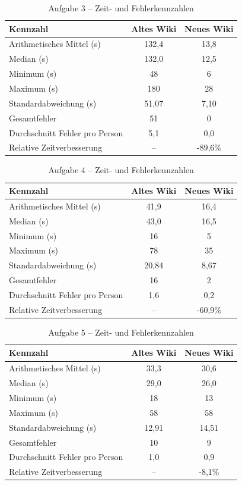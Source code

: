 \begin{table}[H]
\centering
\caption{Aufgabe 3 -- Zeit- und Fehlerkennzahlen}
\label{tab:BB-task3-stats}
\begin{tabular}{l c c}
\toprule
Kennzahl & Altes Wiki & Neues Wiki \\
\midrule
Arithmetisches Mittel (s) & 132,4 & 13,8 \\
Median (s) & 132,0 & 12,5 \\
Minimum (s) & 48 & 6 \\
Maximum (s) & 180 & 28 \\
Standardabweichung (s) & 51,07 & 7,10 \\
Gesamtfehler & 51 & 0 \\
Durchschnitt Fehler pro Person & 5,1 & 0,0 \\
Relative Zeitverbesserung & -- & -89,6\% \\
\bottomrule
\end{tabular}
\end{table}

\begin{table}[H]
\centering
\caption{Aufgabe 4 -- Zeit- und Fehlerkennzahlen}
\label{tab:BB-task4-stats}
\begin{tabular}{l c c}
\toprule
Kennzahl & Altes Wiki & Neues Wiki \\
\midrule
Arithmetisches Mittel (s) & 41,9 & 16,4 \\
Median (s) & 43,0 & 16,5 \\
Minimum (s) & 16 & 5 \\
Maximum (s) & 78 & 35 \\
Standardabweichung (s) & 20,84 & 8,67 \\
Gesamtfehler & 16 & 2 \\
Durchschnitt Fehler pro Person & 1,6 & 0,2 \\
Relative Zeitverbesserung & -- & -60,9\% \\
\bottomrule
\end{tabular}
\end{table}

\begin{table}[H]
\centering
\caption{Aufgabe 5 -- Zeit- und Fehlerkennzahlen}
\label{tab:BB-task5-stats}
\begin{tabular}{l c c}
\toprule
Kennzahl & Altes Wiki & Neues Wiki \\
\midrule
Arithmetisches Mittel (s) & 33,3 & 30,6 \\
Median (s) & 29,0 & 26,0 \\
Minimum (s) & 18 & 13 \\
Maximum (s) & 58 & 58 \\
Standardabweichung (s) & 12,91 & 14,51 \\
Gesamtfehler & 10 & 9 \\
Durchschnitt Fehler pro Person & 1,0 & 0,9 \\
Relative Zeitverbesserung & -- & -8,1\% \\
\bottomrule
\end{tabular}
\end{table}

